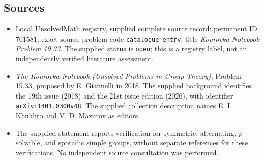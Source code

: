 \documentclass[11pt]{article}
\begin{document}
\subsection{Sources}
\begin{itemize}
\item Local UnsolvedMath registry, supplied complete source record: permanent ID \(701581\), exact source problem code \texttt{catalogue entry}, title \emph{Kourovka Notebook Problem 19.33}. The supplied status is \texttt{open}; this is a registry label, not an independently verified literature assessment.
\item \emph{The Kourovka Notebook (Unsolved Problems in Group Theory)}, Problem 19.33, proposed by E. Giannelli in 2018. The supplied background identifies the 19th issue (2018) and the 21st issue edition (2026), with identifier \texttt{arXiv:1401.0300v48}. The supplied collection description names E. I. Khukhro and V. D. Mazurov as editors.
\item The supplied statement reports verification for symmetric, alternating, \(p\)-solvable, and sporadic simple groups, without separate references for these verifications. No independent source consultation was performed.
\end{itemize}
\end{document}
